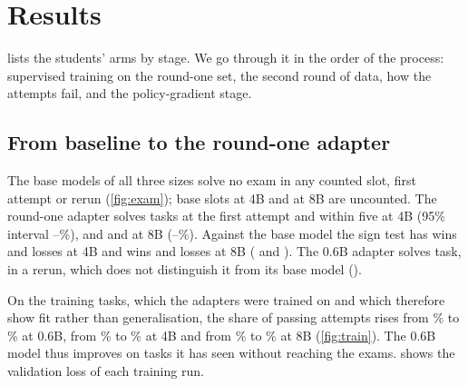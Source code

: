 \section{Results}\label{sec:results}
 lists the students' arms by stage. We go through it in the order of the process: supervised
training on the round-one set, the second round of data, how the attempts fail, and the policy-gradient stage.

\begin{table}[t]
\centering\small\setlength{\tabcolsep}{4pt}

\caption{Exam results by stage; each row is one arm on the 100 exams. \emph{Loop-stopped} is the share of all attempts
  of the arm that the watchdog ended; \emph{repeat after error} is the share of calls directly after a Vim error, in
  first attempts, that repeated the failed call. Wins, losses and the one-sided sign-test $p$ compare solved within five
  with the reference: the base model for the first round-one row, and for a later stage the round-one adapter
  measured in the same run, which carries the same mark ($\dagger$, $\ddagger$, $\S$). The round-one adapter
  therefore appears several times.}\label{tab:stages}
\end{table}

\subsection{From baseline to the round-one adapter}
The base models of all three sizes solve no exam in any counted slot, first attempt or rerun (\cref{fig:exam});
\uncountedFourBase{} base slots at 4B and \uncountedEightBase{} at 8B are uncounted. The round-one adapter solves
\examFourFullOne{} tasks at the first attempt and \examFourFullFive{} within five at 4B (95\% interval
\examFourFullFiveLo--\examFourFullFiveHi{}\%), and \examEightFullOne{} and \examEightFullFive{} at 8B
(\examEightFullFiveLo--\examEightFullFiveHi{}\%). Against the base model the sign test has \winsFourFull{} wins and
\lossesFourFull{} losses at 4B and \winsEightFull{} wins and \lossesEightFull{} losses at 8B (\ptestFourFull{} and
\ptestEightFull{}). The 0.6B adapter solves \examZeroFullFive{} task, in a rerun, which does not
distinguish it from its base model (\ptestZeroFull{}).

On the training tasks, which the adapters were trained on and which therefore show fit rather than generalisation, the
share of passing attempts rises from \trainZeroBasePct{}\% to \trainZeroFullPct{}\% at 0.6B, from \trainFourBasePct{}\%
to \trainFourFullPct{}\% at 4B and from \trainEightBasePct{}\% to \trainEightFullPct{}\% at 8B (\cref{fig:train}). The
0.6B model thus improves on tasks it has seen without reaching the exams.  shows the validation loss of
each training run.


